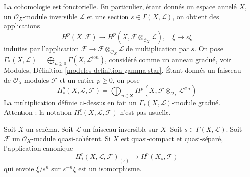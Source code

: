 \noindent
La cohomologie est fonctorielle. En particulier, étant donnés un espace annelé $X$,
un $\mathcal{O}_X$-module inversible $\mathcal{L}$ et une section
$s \in \Gamma(X, \mathcal{L})$, on obtient des applications
$$
H^p(X, \mathcal{F})
\longrightarrow
H^p(X, \mathcal{F} \otimes_{\mathcal{O}_X} \mathcal{L}), \quad
\xi \longmapsto s\xi
$$
induites par l'application
$\mathcal{F} \to \mathcal{F} \otimes_{\mathcal{O}_X} \mathcal{L}$
de multiplication par $s$. On pose
$\Gamma_*(X, \mathcal{L}) =
\bigoplus_{n \geq 0} \Gamma(X, \mathcal{L}^{\otimes n})$,
considéré comme un anneau gradué, voir
Modules, Définition \ref{modules-definition-gamma-star}.
Étant donnés un faisceau de $\mathcal{O}_X$-modules $\mathcal{F}$ et un entier
$p \geq 0$, on pose
$$
H^p_*(X, \mathcal{L}, \mathcal{F}) =
\bigoplus\nolimits_{n \in \mathbf{Z}} H^p(X,
\mathcal{F} \otimes_{\mathcal{O}_X} \mathcal{L}^{\otimes n})
$$
La multiplication définie ci-dessus en fait un $\Gamma_*(X, \mathcal{L})$-module gradué.
Attention : la notation $H^p_*(X, \mathcal{L}, \mathcal{F})$
n'est pas usuelle.

\begin{lemma}
\label{lemma-invert-s-cohomology}
Soit $X$ un schéma. Soit $\mathcal{L}$ un faisceau inversible sur $X$.
Soit $s \in \Gamma(X, \mathcal{L})$.
Soit $\mathcal{F}$ un $\mathcal{O}_X$-module quasi-cohérent.
Si $X$ est quasi-compact et quasi-séparé, l'application canonique
$$
H^p_*(X, \mathcal{L}, \mathcal{F})_{(s)}
\longrightarrow
H^p(X_s, \mathcal{F})
$$
qui envoie $\xi/s^n$ sur $s^{-n}\xi$ est un isomorphisme.
\end{lemma}

